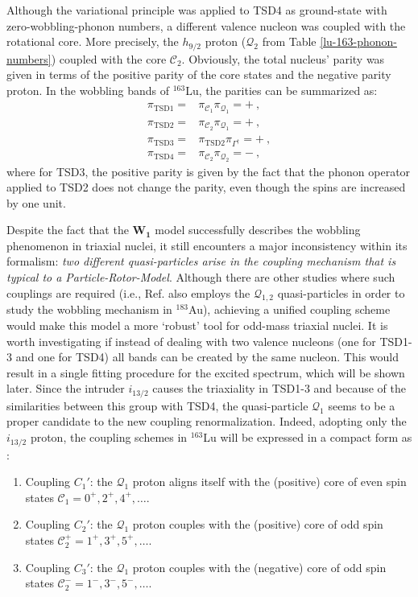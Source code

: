 Although the variational principle was applied to TSD4 as ground-state with zero-wobbling-phonon numbers, a different valence nucleon was coupled with the rotational core. More precisely, the $h_{9/2}$ proton ($\mathcal{Q}_2$ from Table \ref{lu-163-phonon-numbers}) coupled with the core $\mathscr{C}_2$. Obviously, the total nucleus' parity was given in terms of the positive parity of the core states and the negative parity proton. In the wobbling bands of $^{163}$Lu, the parities can be summarized as:
\begin{align}
    \pi_\text{TSD1}=&\pi_{\mathscr{C}_1}\pi_{\mathcal{Q}_1}=+\ ,\nonumber\\
    \pi_\text{TSD2}=&\pi_{\mathscr{C}_2}\pi_{\mathcal{Q}_1}=+\ ,\nonumber\\
    \pi_\text{TSD3}=&\pi_\text{TSD2}\pi_{\Gamma^\dagger}=+\ ,\nonumber\\
    \pi_\text{TSD4}=&\pi_{\mathscr{C}_2}\pi_{\mathcal{Q}_2}=-\ ,
    \label{aw1-parity-list-TSD-bands}
\end{align}
where for TSD3, the positive parity is given by the fact that the phonon operator applied to TSD2 does not change the parity, even though the spins are increased by one unit.

Despite the fact that the $\mathbf{W_1}$ model successfully describes the wobbling phenomenon in triaxial nuclei, it still encounters a major inconsistency within its formalism: \emph{two different quasi-particles arise in the coupling mechanism that is typical to a Particle-Rotor-Model}. Although there are other studies where such couplings are required (i.e., Ref. \cite{nandi2020first} also employs the $\mathcal{Q}_{1,2}$ quasi-particles in order to study the wobbling mechanism in $^{183}$Au), achieving a unified coupling scheme would make this model a more `robust' tool for odd-mass triaxial nuclei. It is worth investigating if instead of dealing with two valence nucleons (one for TSD1-3 and one for TSD4) all bands can be created by the same nucleon. This would result in a single fitting procedure for the excited spectrum, which will be shown later. Since the intruder $i_{13/2}$ causes the triaxiality in TSD1-3 and because of the similarities between this group with TSD4, the quasi-particle $\mathcal{Q}_1$ seems to be a proper candidate to the new coupling renormalization. Indeed, adopting only the $i_{13/2}$ proton, the coupling schemes in $^{163}$Lu will be expressed in a compact form as \cite{poenaru2021extensive1}:
\begin{enumerate}
    \item Coupling $C_1'$: the $\mathcal{Q}_1$ proton aligns itself with the (positive) core of even spin states $\mathscr{C}_1=0^+,2^+,4^+,\dots$.
    \item Coupling $C_2'$: the $\mathcal{Q}_1$ proton couples with the (positive) core of odd spin states $\mathscr{C}_2^+=1^+,3^+,5^+,\dots$.
    \item Coupling $C_3'$: the $\mathcal{Q}_1$ proton couples with the (negative) core of odd spin states $\mathscr{C}_2^-=1^-,3^-,5^-,\dots$.
\end{enumerate}

